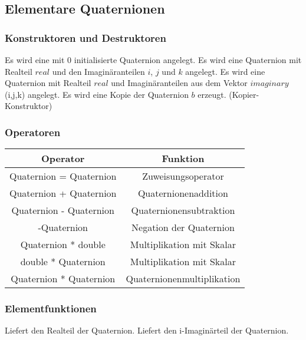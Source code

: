 \hypertarget{Trafo}{}

\subsection{Elementare Quaternionen}
\hypertarget{Quaternion}{}

\subsubsection{Konstruktoren und Destruktoren}
\descr
{
Es wird eine mit 0 initialisierte Quaternion angelegt.
}
\descr
{
Es wird eine Quaternion mit Realteil $real$ und den
Imaginäranteilen $i$, $j$ und $k$ angelegt.
}
\descr
{
Es wird eine Quaternion mit Realteil $real$ und
Imaginäranteilen aus dem Vektor $imaginary$ (i,j,k) angelegt.
}
{
Es wird eine Kopie der Quaternion $b$ erzeugt. (Kopier-Konstruktor) 
}
\subsubsection{Operatoren}
\begin{tabular}{|c|c|}
\hline
Operator & Funktion\\ 
\hline
Quaternion = Quaternion & Zuweisungsoperator\\
\hline
Quaternion + Quaternion & Quaternionenaddition\\
\hline
Quaternion - Quaternion & Quaternionensubtraktion\\
\hline
-Quaternion & Negation der Quaternion\\
\hline
Quaternion * double & Multiplikation mit Skalar\\
\hline
double * Quaternion & Multiplikation mit Skalar\\
\hline
Quaternion * Quaternion & Quaternionenmultiplikation\\
\hline
\end{tabular}

\subsubsection{Elementfunktionen}
\descr
{
Liefert den Realteil der Quaternion.
}
\descr
{
Liefert den i-Imaginärteil der Quaternion.
}

